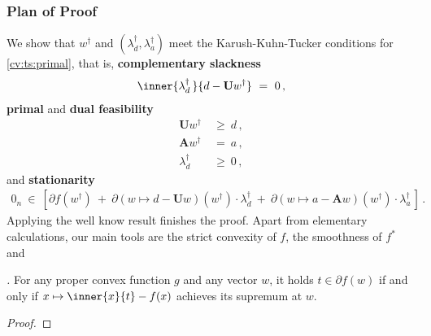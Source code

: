 \subsubsection*{Plan of Proof}
We show that 
$w^\dagger$ and 
$
(\lambda_d^\dagger,\lambda_a^\dagger)
$
meet the 
Karush-Kuhn-Tucker conditions for \ref{cv:ts:primal},
that is,
\textbf{complementary slackness}
\begin{gather}
\inner
{\lambda_d^\dagger\,}{d-\mathbf{U} w^\dagger}
\ 
=
\ 
0
\,,
\end{gather}
\textbf{primal} and \textbf{dual feasibility}
\begin{align}
  \label{primal_feas}
    \mathbf{U}w^\dagger
    &
    \ 
    \ge
    \ 
    d
    \,,
    \\
    \nonumber
    \mathbf{A}w^\dagger
    &
    \ 
    =
    \ 
    a
    \,,
  \\
  \label{dual_feas}
  \lambda_d^\dagger
    &
    \ 
  \ge
  \ 
  0
    \,,
\end{align}
and 
\textbf{stationarity}
\begin{gather}
  \mathrm{0}_n
  \ 
  \in
  \ 
  [
  \partial
  f(w^\dagger)
  \ 
  +
  \ 
    \partial
    \left( 
      w
      \mapsto
      d
      -
      \mathbf{U}w
    \right)
    (w^\dagger)
    \cdot
    \lambda_d^\dagger
    \ 
    +
    \ 
    \partial
    \left( 
      w
      \mapsto
      a
      -
      \mathbf{A}w
    \right)
    (w^\dagger)
    \cdot
    \lambda_a^\dagger
    \,
  ]
  \,.
\end{gather}
Applying the well know result\cite[Theorem~28.3]{Rockafellar1970}
finishes the proof.
Apart from elementary calculations, our main tools are the 
strict convexity of $f$, the smoothness of $f^*$ and 
\begin{proposition}
  \emph{
\cite[Theorem~23.5(a)-(b)]{Rockafellar1970}.
  }
  \label{cv:ts:prop}
   For any proper convex function $g$ and any vector $w$, 
   it holds $t\in \partial f(w)$ 
   if and only if 
   $
   x
   \mapsto
   \inner
   {x}{t}
   -
   f(x)
   $
   achieves its supremum at $w$.
\end{proposition}

\begin{proof}
\end{proof}
